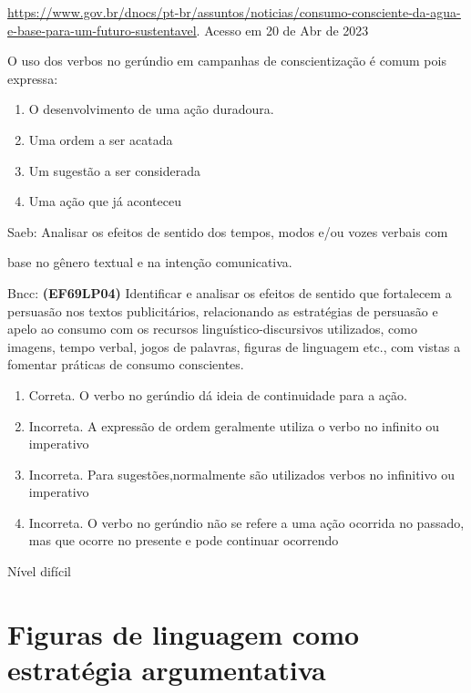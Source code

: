 {\href{https://www.gov.br/dnocs/pt-br/assuntos/noticias/consumo-consciente-da-agua-e-base-para-um-futuro-sustentavel}{\uline{https://www.gov.br/dnocs/pt-br/assuntos/noticias/consumo-consciente-da-agua-e-base-para-um-futuro-sustentavel}}.
Acesso em 20 de Abr de 2023

O uso dos verbos no gerúndio em campanhas de conscientização é comum
pois expressa:

\begin{enumerate}
\def\labelenumi{\alph{enumi})}
\item
  O desenvolvimento de uma ação duradoura.
\item
  Uma ordem a ser acatada
\item
  Um sugestão a ser considerada
\item
  Uma ação que já aconteceu
\end{enumerate}

Saeb: Analisar os efeitos de sentido dos tempos, modos e/ou vozes
verbais com

base no gênero textual e na intenção comunicativa.

Bncc: \textbf{(EF69LP04)} Identificar e analisar os efeitos de sentido
que fortalecem a persuasão nos textos publicitários, relacionando as
estratégias de persuasão e apelo ao consumo com os recursos
linguístico-discursivos utilizados, como imagens, tempo verbal, jogos de
palavras, figuras de linguagem etc., com vistas a fomentar práticas de
consumo conscientes.

\begin{enumerate}
\def\labelenumi{\arabic{enumi}.}
\item
  Correta. O verbo no gerúndio dá ideia de continuidade para a ação.
\item
  Incorreta. A expressão de ordem geralmente utiliza o verbo no infinito
  ou imperativo
\item
  Incorreta. Para sugestões,normalmente são utilizados verbos no
  infinitivo ou imperativo
\item
  Incorreta. O verbo no gerúndio não se refere a uma ação ocorrida no
  passado, mas que ocorre no presente e pode continuar ocorrendo
\end{enumerate}

Nível difícil


\chapter{Figuras de linguagem como estratégia argumentativa}

}
